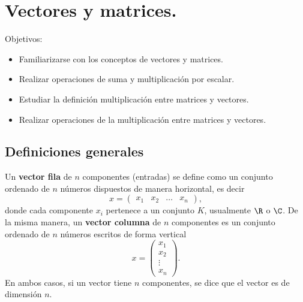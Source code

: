 \section{Vectores y matrices.}
Objetivos:
\begin{itemize}
    \item Familiarizarse con los conceptos de vectores y matrices.
    \item Realizar operaciones de suma y multiplicación por escalar.
    \item Estudiar la definición multiplicación entre matrices y vectores.
    \item Realizar operaciones de la multiplicación entre matrices y
vectores.
\end{itemize}

\subsection{Definiciones generales}
Un \textbf{vector fila} de $n$ componentes (entradas) se define como un conjunto ordenado de $n$ números dispuestos de manera horizontal, es decir 
\[x= \left(\begin{array}{ccccc}
   x_1 & x_2 &  \dots&  x_n 
\end{array}\right),\]
donde cada componente $x_i$ pertenece a un conjunto $K$, usualmente $\R$ o $\C$. 
De la misma manera, un \textbf{vector columna} de $n$ componentes es un conjunto ordenado de $n$ números escritos de forma vertical
\[ x=\left(\begin{array}{c}
   x_1 \\
   x_2 \\
   \vdots\\
   x_n 
\end{array}\right).\]
En ambos casos, si un vector tiene $n$ componentes, se dice que el vector es de dimensión $n$.
